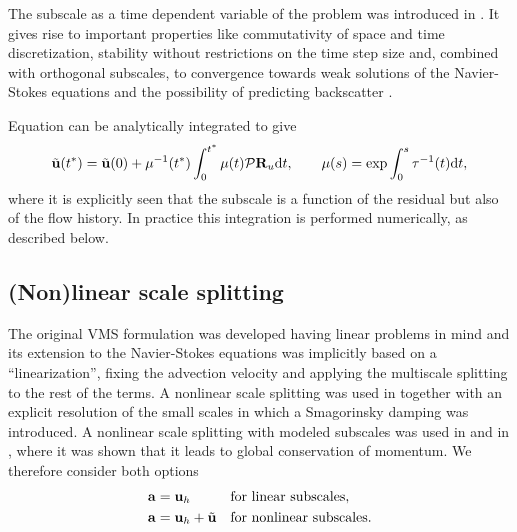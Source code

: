 The subscale as a time dependent variable of the problem was introduced in \cite{codina_stabilized_2002,codina_time_2007}. It gives rise to important properties like commutativity of space and time discretization, stability without restrictions on the time step size \cite{codina_time_2007,Badia2009a} and, combined with orthogonal subscales, to convergence towards weak solutions of the Navier-Stokes equations \cite{Badia2013Convergence} and the possibility of predicting backscatter \cite{Codina-chap-2011,Principe2009}. 

Equation  can be analytically integrated to give
\begin{equation}
\label{eq:exact_sgs}
\tilde{{\bf u}}(t^*)=\tilde{{\bf u}}(0) + \mu^{-1}(t^*) \int_0^{t^*} \mu(t) \mathcal{P}{\bf R}_u {\rm d}t, \quad \quad \mu(s)=\exp \int_0^s \tau^{-1}(t){\rm d}t,
\end{equation}
where it is explicitly seen that the subscale is a function of the residual but also of the flow history. In practice this integration is performed numerically, as described below.

\subsection{(Non)linear scale splitting}
\label{subsec-C2_nl}
The original VMS formulation \cite{hughes_multiscale_1995,hughes_variational_1998} was developed having linear problems in mind and its extension to the Navier-Stokes equations was implicitly based on a ``linearization'', fixing the advection velocity and applying the multiscale splitting to the rest of the terms. A nonlinear scale splitting was used in \cite{Hughes2000,hughes_large_2001} together with an explicit resolution of the small scales in which a Smagorinsky damping was introduced. A nonlinear scale splitting with modeled subscales was used in \cite{codina_stabilized_2002, bazilevs_variational_2007} and in \cite{codina_time_2007}, where it was shown that it leads to global conservation of momentum. We therefore consider both options
\begin{align}
\label{eq-C2_a_lin}
&{\bf a}={\bf u}_h&&\mbox{for linear subscales},\\
\label{eq-C2_a_nl}
&{\bf a}={\bf u}_h+\tilde{{\bf u}}&&\mbox{for nonlinear subscales}.
\end{align}

